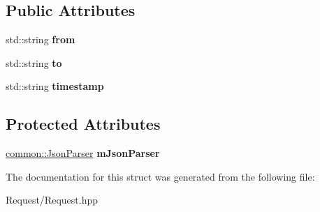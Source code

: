 \subsection*{Public Attributes}
\begin{DoxyCompactItemize}
\item 
\mbox{\label{structts_1_1common_1_1_request_a1f578f8c9142bf98dfeefc4e16947cf6}} 
std\+::string {\bfseries from}
\item 
\mbox{\label{structts_1_1common_1_1_request_ae5c1db68c87705e6b6d86c86a581bf4a}} 
std\+::string {\bfseries to}
\item 
\mbox{\label{structts_1_1common_1_1_request_abce8a750f3e89ed10e6a37c0d176151c}} 
std\+::string {\bfseries timestamp}
\end{DoxyCompactItemize}
\subsection*{Protected Attributes}
\begin{DoxyCompactItemize}
\item 
\mbox{\label{structts_1_1common_1_1_request_ac92c52f3fe2cea815e62c0f999d569bb}} 
\hyperlink{classts_1_1common_1_1_json_parser}{common\+::\+Json\+Parser} {\bfseries m\+Json\+Parser}
\end{DoxyCompactItemize}


The documentation for this struct was generated from the following file\+:\begin{DoxyCompactItemize}
\item 
Request/Request.\+hpp\end{DoxyCompactItemize}

